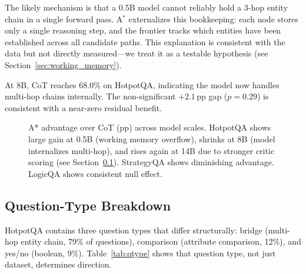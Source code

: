 \documentclass{article}
\newcommand{\astar}{A$^*$\xspace}
\begin{document}
The likely mechanism is that a 0.5B model cannot reliably hold a 3-hop entity chain in a single forward pass. \astar externalizes this bookkeeping: each node stores only a single reasoning step, and the frontier tracks which entities have been established across all candidate paths. This explanation is consistent with the data but not directly measured---we treat it as a testable hypothesis (see Section~\ref{sec:working_memory}).

At 8B, CoT reaches 68.0\% on HotpotQA, indicating the model now handles multi-hop chains internally. The non-significant $+2.1$\,pp gap ($p=0.29$) is consistent with a near-zero residual benefit.

\begin{figure}[h]
\centering
{}
\caption{A* advantage over CoT (pp) across model scales. HotpotQA shows large gain at 0.5B (working memory overflow), shrinks at 8B (model internalizes multi-hop), and rises again at 14B due to stronger critic scoring (see Section~\ref{sec:qtype}). StrategyQA shows diminishing advantage. LogicQA shows consistent null effect.}
\label{fig:scale_gap}
\end{figure}

\subsection{Question-Type Breakdown}
\label{sec:qtype}

HotpotQA contains three question types that differ structurally: bridge (multi-hop entity chain, 79\% of questions), comparison (attribute comparison, 12\%), and yes/no (boolean, 9\%). Table~\ref{tab:qtype} shows that question type, not just dataset, determines direction.
\end{document}
